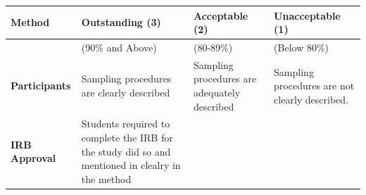 \documentclass[
  openany]{book}
\begin{document}
\begin{longtable}[]{@{}llll@{}}
\toprule
\begin{minipage}[b]{0.22\columnwidth}\raggedright
Method\strut
\end{minipage} & \begin{minipage}[b]{0.22\columnwidth}\raggedright
Outstanding (3)\strut
\end{minipage} & \begin{minipage}[b]{0.22\columnwidth}\raggedright
Acceptable (2)\strut
\end{minipage} & \begin{minipage}[b]{0.22\columnwidth}\raggedright
Unacceptable (1)\strut
\end{minipage}\tabularnewline
\midrule
\endhead
\begin{minipage}[t]{0.22\columnwidth}\raggedright
\strut
\end{minipage} & \begin{minipage}[t]{0.22\columnwidth}\raggedright
(90\% and Above)\strut
\end{minipage} & \begin{minipage}[t]{0.22\columnwidth}\raggedright
(80-89\%)\strut
\end{minipage} & \begin{minipage}[t]{0.22\columnwidth}\raggedright
(Below 80\%)\strut
\end{minipage}\tabularnewline
\begin{minipage}[t]{0.22\columnwidth}\raggedright
\textbf{Participants}\strut
\end{minipage} & \begin{minipage}[t]{0.22\columnwidth}\raggedright
Sampling procedures are clearly described\strut
\end{minipage} & \begin{minipage}[t]{0.22\columnwidth}\raggedright
Sampling procedures are adequately described\strut
\end{minipage} & \begin{minipage}[t]{0.22\columnwidth}\raggedright
Sampling procedures are not clearly described.\strut
\end{minipage}\tabularnewline
\begin{minipage}[t]{0.22\columnwidth}\raggedright
\textbf{IRB Approval}\strut
\end{minipage} & \begin{minipage}[t]{0.22\columnwidth}\raggedright
Students required to complete the IRB for the study did so and mentioned in clealry in the method\strut
\end{minipage} & \begin{minipage}[t]{0.22\columnwidth}\raggedright

\end{minipage}
\end{longtable}
\end{document}

